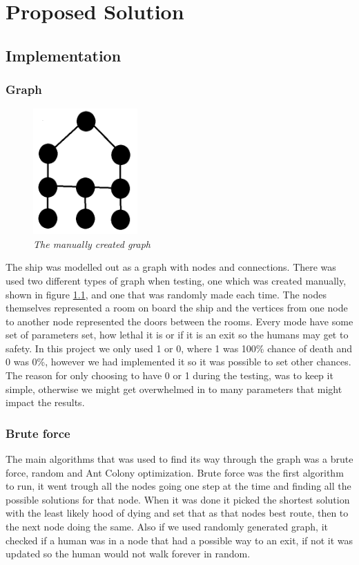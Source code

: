 \chapter{Proposed Solution}
\label{ch:solution}


\section{Implementation}

\subsection{Graph}
\begin{figure} %
\includegraphics[width=40mm]{images/manuallyGraph.png}
\caption{\textit{The manually created graph}}
\label{smallgraph}
\end{figure}
The ship was modelled out as a graph with nodes and connections. There was used two different types of graph when testing, one which was created manually, shown in figure \ref{smallgraph}, and one that was randomly made each time. The nodes themselves represented a room on board the ship and the vertices from one node to another node represented the doors between the rooms. Every mode have some set of parameters set, how lethal it is or if it is an exit so the humans may get to safety. In this project we only used 1 or 0, where 1 was 100\% chance of death and 0 was 0\%, however we had implemented it so it was possible to set other chances. The reason for only choosing to have 0 or 1 during the testing, was to keep it simple, otherwise we might get overwhelmed in to many parameters that might impact the results. 


\subsection{Brute force}
The main algorithms that was used to find its way through the graph was a brute force, random and Ant Colony optimization. Brute force was the first algorithm to run, it went trough all the nodes going one step at the time and finding all the possible solutions for that node. When it was done it picked the shortest solution with the least likely hood of dying and set that as that nodes best route, then to the next node doing the same. Also if we used randomly generated graph, it checked if a human was in a node that had a possible way to an exit, if not it was updated so the human would not walk forever in random. 

